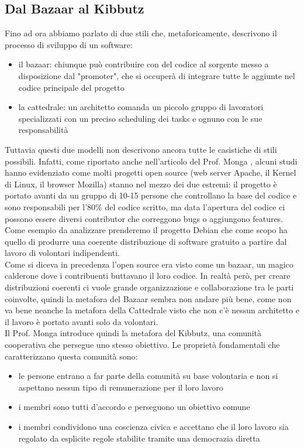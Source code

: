 \subsection{Dal Bazaar al Kibbutz}
Fino ad ora abbiamo parlato di due stili che, metaforicamente, descrivono il processo di sviluppo di un software:
\begin{itemize}
    \item il bazaar: chiunque può contribuire con del codice al sorgente messo a disposizione dal "promoter", che si occuperà di integrare tutte le aggiunte nel codice principale del progetto
    \item la cattedrale: un architetto comanda un piccolo gruppo di lavoratori specializzati con un preciso scheduling dei tasks e ognuno con le sue responsabilità
\end{itemize}
Tuttavia questi due modelli non descrivono ancora tutte le casistiche di stili possibili. Infatti, come riportato anche nell'articolo del Prof. Monga \cite{bazaarkibbutz}, alcuni studi hanno evidenziato come molti progetti open source (web server Apache, il Kernel di Linux, il browser Mozilla) stanno nel mezzo dei due estremi: il progetto è portato avanti da un gruppo di 10-15 persone che controllano la base del codice e sono responsabili per l'80\% del codice scritto, ma data l'apertura del codice ci possono essere diversi contributor che correggono bugs o aggiungono features.\\
Come esempio da analizzare prenderemo il progetto Debian che come scopo ha quello di produrre una coerente distribuzione di software gratuito a partire dal lavoro di volontari indipendenti. \\
Come si diceva in precedenza l'open source era visto come un bazaar, un magico calderone dove i contribuenti buttavano il loro codice. In realtà però, per creare distribuzioni coerenti ci vuole grande organizzazione e collaborazione tra le parti coinvolte, quindi la metafora del Bazaar sembra non andare più bene, come non va bene neanche la metafora della Cattedrale visto che non c'è nessun architetto e il lavoro è portato avanti solo da volontari.\\ Il Prof. Monga introduce quindi la metafora del Kibbutz, una comunità cooperativa che persegue uno stesso obiettivo. Le proprietà fondamentali che caratterizzano questa comunità sono:
\begin{itemize}
    \item le persone entrano a far parte della comunità su base volontaria e non si aspettano nessun tipo di remunerazione per il loro lavoro
    \item i membri sono tutti d'accordo e perseguono un obiettivo comune
    \item i membri condividono una coscienza civica e accettano che il loro lavoro sia regolato da esplicite regole stabilite tramite una democrazia diretta
\end{itemize}

